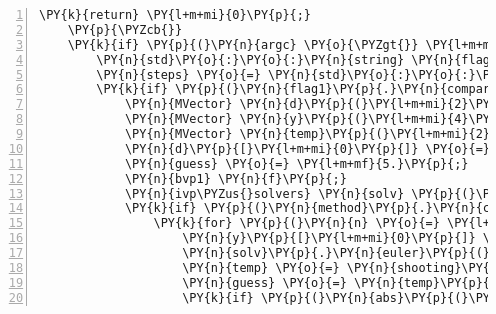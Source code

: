 \begin{Verbatim}[commandchars=\\\{\},numbers=left,firstnumber=1,stepnumber=1]
		\PY{k}{return} \PY{l+m+mi}{0}\PY{p}{;}
	\PY{p}{\PYZcb{}}
	\PY{k}{if} \PY{p}{(}\PY{n}{argc} \PY{o}{\PYZgt{}} \PY{l+m+mi}{3}\PY{p}{)}\PY{p}{\PYZob{}} \PY{c+c1}{// so long as we have more than 2 arguments we are good to go}
		\PY{n}{std}\PY{o}{:}\PY{o}{:}\PY{n}{string} \PY{n}{flag1} \PY{o}{=} \PY{n}{argv}\PY{p}{[}\PY{l+m+mi}{1}\PY{p}{]}\PY{p}{;}
		\PY{n}{steps} \PY{o}{=} \PY{n}{std}\PY{o}{:}\PY{o}{:}\PY{n}{stoi}\PY{p}{(}\PY{n}{argv}\PY{p}{[}\PY{l+m+mi}{3}\PY{p}{]}\PY{p}{)}\PY{p}{;} \PY{c+c1}{// c++11 way to change a string to an int}
		\PY{k}{if} \PY{p}{(}\PY{n}{flag1}\PY{p}{.}\PY{n}{compare}\PY{p}{(}\PY{l+s}{\PYZdq{}}\PY{l+s}{\PYZhy{}b1}\PY{l+s}{\PYZdq{}}\PY{p}{)} \PY{o}{=}\PY{o}{=} \PY{l+m+mi}{0}\PY{p}{)}\PY{p}{\PYZob{}}
			\PY{n}{MVector} \PY{n}{d}\PY{p}{(}\PY{l+m+mi}{2}\PY{p}{)}\PY{p}{;} \PY{c+c1}{// set the boundary conditions}
			\PY{n}{MVector} \PY{n}{y}\PY{p}{(}\PY{l+m+mi}{4}\PY{p}{)}\PY{p}{;} \PY{c+c1}{// to contain the problem}
			\PY{n}{MVector} \PY{n}{temp}\PY{p}{(}\PY{l+m+mi}{2}\PY{p}{)}\PY{p}{;} \PY{c+c1}{// keep the output from shooting}
			\PY{n}{d}\PY{p}{[}\PY{l+m+mi}{0}\PY{p}{]} \PY{o}{=} \PY{l+m+mi}{0}\PY{p}{;} \PY{n}{d}\PY{p}{[}\PY{l+m+mi}{1}\PY{p}{]} \PY{o}{=} \PY{l+m+mi}{1}\PY{p}{;}
			\PY{n}{guess} \PY{o}{=} \PY{l+m+mf}{5.}\PY{p}{;}
			\PY{n}{bvp1} \PY{n}{f}\PY{p}{;}
			\PY{n}{ivp\PYZus{}solvers} \PY{n}{solv} \PY{p}{(}\PY{n}{steps}\PY{p}{,} \PY{l+m+mi}{0}\PY{p}{,} \PY{l+m+mi}{1}\PY{p}{)}\PY{p}{;}
			\PY{k}{if} \PY{p}{(}\PY{n}{method}\PY{p}{.}\PY{n}{compare}\PY{p}{(}\PY{l+s}{\PYZdq{}}\PY{l+s}{euler}\PY{l+s}{\PYZdq{}}\PY{p}{)} \PY{o}{=}\PY{o}{=} \PY{l+m+mi}{0}\PY{p}{)}\PY{p}{\PYZob{}}
				\PY{k}{for} \PY{p}{(}\PY{n}{n} \PY{o}{=} \PY{l+m+mi}{0}\PY{p}{;} \PY{n}{n} \PY{o}{\PYZlt{}} \PY{l+m+mi}{500}\PY{p}{;} \PY{n}{n}\PY{o}{+}\PY{o}{+}\PY{p}{)}\PY{p}{\PYZob{}}
					\PY{n}{y}\PY{p}{[}\PY{l+m+mi}{0}\PY{p}{]} \PY{o}{=} \PY{l+m+mf}{0.}\PY{p}{;} \PY{n}{y}\PY{p}{[}\PY{l+m+mi}{1}\PY{p}{]} \PY{o}{=} \PY{n}{guess}\PY{p}{;} \PY{n}{y}\PY{p}{[}\PY{l+m+mi}{2}\PY{p}{]} \PY{o}{=} \PY{l+m+mf}{0.}\PY{p}{;} \PY{n}{y}\PY{p}{[}\PY{l+m+mi}{3}\PY{p}{]} \PY{o}{=} \PY{l+m+mf}{1.}\PY{p}{;}
					\PY{n}{solv}\PY{p}{.}\PY{n}{euler}\PY{p}{(}\PY{n}{y}\PY{p}{,} \PY{n}{f}\PY{p}{,} \PY{n}{j}\PY{p}{)}\PY{p}{;}
					\PY{n}{temp} \PY{o}{=} \PY{n}{shooting}\PY{p}{(}\PY{n}{guess}\PY{p}{,} \PY{n}{y}\PY{p}{,} \PY{n}{d}\PY{p}{)}\PY{p}{;}
					\PY{n}{guess} \PY{o}{=} \PY{n}{temp}\PY{p}{[}\PY{l+m+mi}{0}\PY{p}{]}\PY{p}{;}
					\PY{k}{if} \PY{p}{(}\PY{n}{abs}\PY{p}{(}\PY{n}{temp}\PY{p}{[}\PY{l+m+mi}{1}\PY{p}{]}\PY{p}{)}\PY{o}{\PYZlt{}}\PY{n}{tol}\PY{p}{)}\PY{p}{\PYZob{}} \PY{c+c1}{// finish the loop when sufficently close}

\end{Verbatim}
